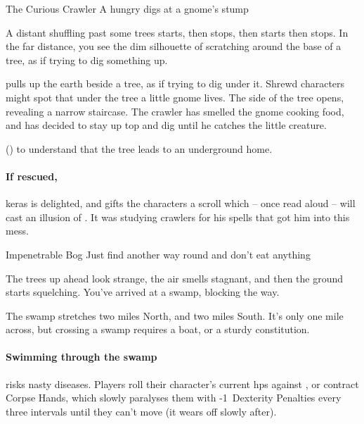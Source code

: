 \label{interruptions}

{The Curious Crawler}%
{A hungry  digs at a gnome's stump}%

\begin{boxtext}
  A distant shuffling past some trees starts, then stops, then starts then stops.
  In the far distance, you see the dim silhouette of  scratching around the base of a tree, as if trying to dig something up.
\end{boxtext}

 pulls up the earth beside a tree, as if trying to dig under it.
Shrewd characters might spot that under the tree a little gnome lives.
The side of the tree opens, revealing a narrow staircase.
The \gls{crawler} has smelled the gnome cooking food, and has decided to stay up top and dig until he catches the little creature.

 (\tn[9]) to understand that the tree leads to an underground home.

\chitincrawler

\paragraph{If rescued,}
\gls{keras} is delighted, and gifts the characters a scroll which -- once read aloud -- will cast an illusion of .
It was studying \glspl{crawler} for his spells that got him into this mess.

\keras

{Impenetrable Bog}%
{Just find another way round and don't eat anything}%

\begin{boxtext}
  The trees up ahead look strange, the air smells stagnant, and then the ground starts squelching.
  You've arrived at a swamp, blocking the way.
\end{boxtext}

The swamp stretches two miles North, and two miles South.
It's only one mile across, but crossing a swamp requires a boat, or a sturdy constitution.

\paragraph{Swimming through the swamp}
risks nasty diseases.
Players roll their character's current \glspl{hp} against \tn[8], or contract Corpse Hands,%
which slowly paralyses them with -1~Dexterity Penalties every three \glspl{interval} until they can't move (it wears off slowly after).

